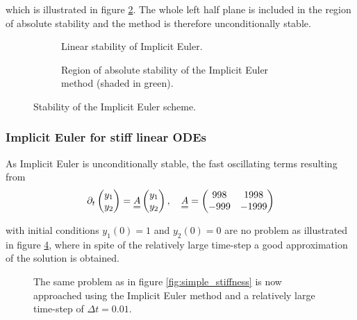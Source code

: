 which is illustrated in figure \ref{fig:imp_eul_stab_reg}. The whole left half plane is included in the region of absolute stability and the method is therefore unconditionally stable.

\begin{figure}
  \centering
  \begin{subfigure}{.5\textwidth}
    \centering
    
    \caption[width=.92\linewidth]{Linear stability of Implicit Euler.}
    \label{fig:imp_eul_lin_stab}
  \end{subfigure}%
  \begin{subfigure}{.5\textwidth}
    \centering
    
    \caption[width=.92\linewidth]{Region of absolute stability of the Implicit Euler method (shaded in green).}
    \label{fig:imp_eul_stab_reg}
  \end{subfigure}
  \caption{Stability of the Implicit Euler scheme.}
  \label{fig:imp_eul_total}
\end{figure}

\subsubsection*{Implicit Euler for stiff linear ODEs}
As Implicit Euler is unconditionally stable, the fast oscillating terms resulting from
\[
  \partial_t \begin{pmatrix} y_1 \\ y_2 \end{pmatrix} = \mat{A} \begin{pmatrix} y_1 \\ y_2 \end{pmatrix}, \quad \mat{A} = \begin{pmatrix} 998 & 1998 \\ -999 & -1999 \end{pmatrix}
\]

with initial conditions $y_1(0) = 1$ and $y_2(0) = 0$ are no problem as illustrated in figure \ref{fig:simple_stiffness_impl}, where in spite of the relatively large time-step a good approximation of the solution is obtained.

\begin{figure}[!htb]
  \centering
  \hfill
  \caption{The same problem as in figure \ref{fig:simple_stiffness} is now approached using the Implicit Euler method and a relatively large time-step of $\Delta t = 0.01$.}
  \label{fig:simple_stiffness_impl}
\end{figure}

